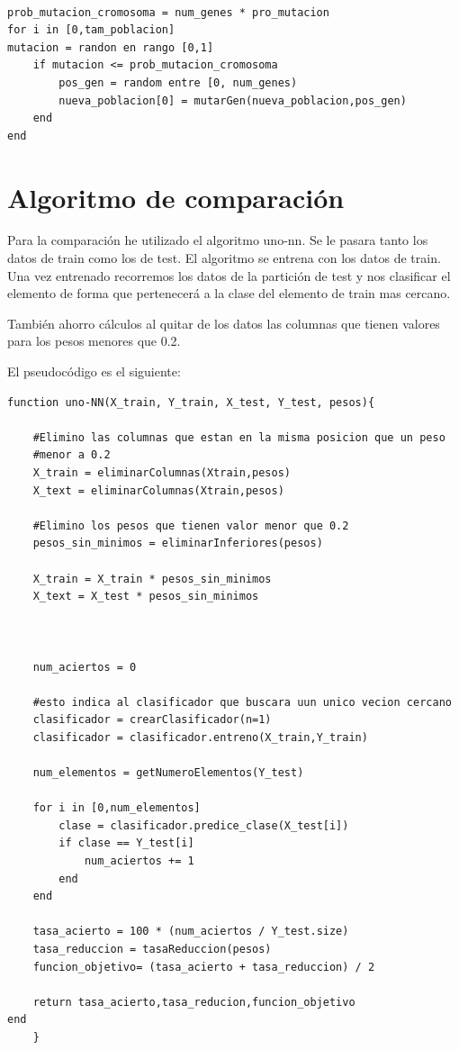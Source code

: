 \documentclass[titlepage]{article}
\begin{document}
	\begin{lstlisting}

prob_mutacion_cromosoma = num_genes * pro_mutacion	
for i in [0,tam_poblacion]
mutacion = randon en rango [0,1]
	if mutacion <= prob_mutacion_cromosoma	
		pos_gen = random entre [0, num_genes)
		nueva_poblacion[0] = mutarGen(nueva_poblacion,pos_gen)
	end	
end
	\end{lstlisting}
	\newpage
	
	
	\section{Algoritmo de comparación}

	
	Para la comparación he utilizado el algoritmo uno-nn. Se le pasara tanto los datos de train como los de test. El algoritmo se entrena con los datos de train. Una vez entrenado recorremos los datos de la partición de test y nos clasificar el elemento de forma que pertenecerá a la clase del elemento de train mas cercano.
	
	
	También ahorro cálculos al quitar de los datos las columnas que tienen valores para los pesos menores que 0.2. 
	
	El pseudocódigo es el siguiente:

	
	\begin{lstlisting}
function uno-NN(X_train, Y_train, X_test, Y_test, pesos){
	
	#Elimino las columnas que estan en la misma posicion que un peso 
	#menor a 0.2
	X_train = eliminarColumnas(Xtrain,pesos)
	X_text = eliminarColumnas(Xtrain,pesos)
	
	#Elimino los pesos que tienen valor menor que 0.2
	pesos_sin_minimos = eliminarInferiores(pesos)
	
	X_train = X_train * pesos_sin_minimos
	X_text = X_test * pesos_sin_minimos
	
	
	
	num_aciertos = 0
	
	#esto indica al clasificador que buscara uun unico vecion cercano
	clasificador = crearClasificador(n=1)
	clasificador = clasificador.entreno(X_train,Y_train)
	
	num_elementos = getNumeroElementos(Y_test)
	
	for i in [0,num_elementos]
		clase = clasificador.predice_clase(X_test[i])
		if clase == Y_test[i]
			num_aciertos += 1
		end
	end
	
	tasa_acierto = 100 * (num_aciertos / Y_test.size)
	tasa_reduccion = tasaReduccion(pesos)
	funcion_objetivo= (tasa_acierto + tasa_reduccion) / 2
	
	return tasa_acierto,tasa_reducion,funcion_objetivo
end
	}
	\end{lstlisting}
	
\end{document}
